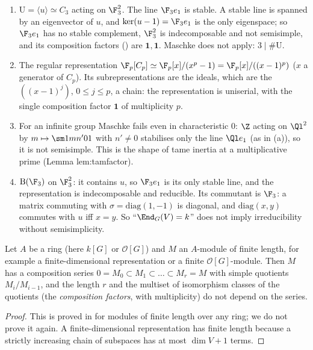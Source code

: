 \begin{example}\label{ex:reps:maschke-fails}
\begin{enumerate}[label=(\alph*)]
\item $\mathrm U=\langle u\rangle\simeq C_3$ acting on $\F_3^2$. The line $\F_3e_1$ is stable. A stable line is spanned by an eigenvector of $u$, and
$\ker(u-1)=\F_3e_1$ is the only eigenspace; so $\F_3e_1$ has no stable complement, $\F_3^2$ is indecomposable and not semisimple, and its
composition factors () are $\mathbf1,\mathbf1$. Maschke does not apply: $3\mid\#\mathrm U$.
\item The regular representation $\F_p[C_p]\simeq\F_p[x]/(x^p-1)=\F_p[x]/((x-1)^p)$ ($x$ a generator of $C_p$). Its subrepresentations are the ideals,
which are the $((x-1)^j)$, $0\le j\le p$, a chain: the representation is uniserial, with the single composition factor $\mathbf1$ of
multiplicity $p$.
\item For an infinite group Maschke fails even in characteristic $0$: $\Z$ acting on $\Ql^2$ by $m\mapsto\sm1{mn'}01$ with $n'\ne0$ stabilises
only the line $\Ql e_1$ (as in (a)), so it is not semisimple. This is the shape of tame inertia at a multiplicative prime
(Lemma lem:tamfactor).
\item $\mathrm B(\F_3)$ on $\F_3^2$: it contains $u$, so $\F_3e_1$ is its only stable line, and the representation is indecomposable and reducible.
Its commutant is $\F_3$: a matrix commuting with $\sigma=\mathrm{diag}(1,-1)$ is diagonal, and $\mathrm{diag}(x,y)$ commutes with $u$ iff $x=y$. So
``$\End_G(V)=k$'' does not imply irreducibility without semisimplicity.
\end{enumerate}
\end{example}

\begin{theorem}\label{thm:reps:jordan-holder}
Let $A$ be a ring (here $k[G]$ or $\mathcal{O}[G]$) and $M$ an $A$-module of finite length, for example a finite-dimensional representation or a
finite $\mathcal{O}[G]$-module. Then $M$ has a composition series $0=M_0\subset M_1\subset\dots\subset M_r=M$ with simple quotients $M_i/M_{i-1}$, and the
length $r$ and the multiset of isomorphism classes of the quotients (the \emph{composition factors}, with multiplicity) do not depend
on the series.
\end{theorem}

\begin{proof}
This is proved in  for modules of finite length over any ring; we do not prove it again. A
finite-dimensional representation has finite length because a strictly increasing chain of subspaces has at most $\dim V+1$ terms.
\end{proof}


